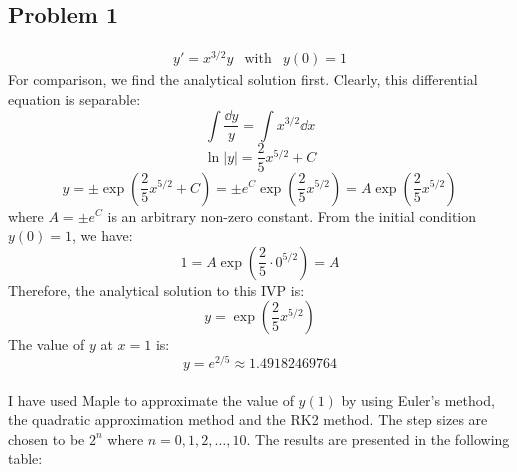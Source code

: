 \documentclass{article}
\begin{document}
\subsection{Problem 1}
\begin{eqnarray}
  y'= x^{3/2} y & \text{with} & y(0)=1
\end{eqnarray}
For comparison, we find the analytical solution first. Clearly, this differential equation is separable:
\begin{equation}
  \int \frac{\dd y}{y} = \int x^{3/2} \dd x
\end{equation}
\begin{equation}
  \ln|y| = \frac{2}{5}x^{5/2} + C
\end{equation}
\begin{equation}
   y = \pm \exp(\frac{2}{5}x^{5/2} + C) = \pm e^C \exp(\frac{2}{5}x^{5/2}) = A \exp(\frac{2}{5}x^{5/2})
\end{equation}
where \(A = \pm e^C\) is an arbitrary non-zero constant. From the initial condition \(y(0)=1\), we have:
\begin{equation}
  1 = A \exp(\frac{2}{5}\cdot 0^{5/2}) = A
\end{equation}
Therefore, the analytical solution to this IVP is:
\begin{equation}
   y = \exp(\frac{2}{5}x^{5/2})
\end{equation}
The value of \(y\) at \(x= 1\) is:
\begin{equation}
  y = e^{2/5} \approx 1.49182469764
\end{equation}
\\
I have used Maple to approximate the value of \(y(1)\) by using Euler's method, the quadratic approximation method and the
RK2 method. The step sizes are chosen to be \(2^n\) where \(n = 0,1,2,\ldots, 10\). The results are presented in the
following table:
\end{document}
